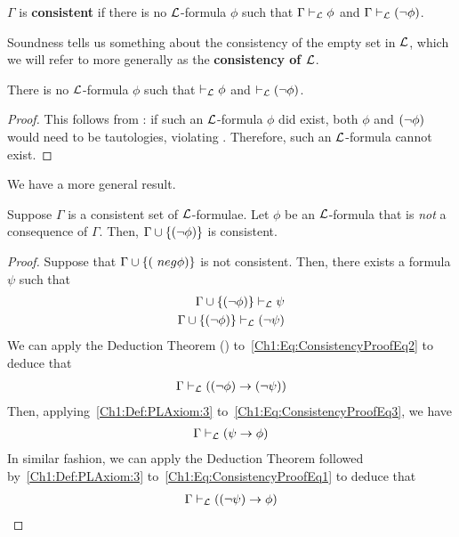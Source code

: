 \begin{boxdefinition}[Consistency]
    $\Gamma$ is \textbf{consistent} if there is no $\L$-formula $\phi$ such that $\Gamma \vdash_{\mathcal{L}} \phi$ and $\Gamma \vdash_{\mathcal{L}} \left( \neg \phi \right)$.
\end{boxdefinition}

Soundness tells us something about the consistency of the empty set in $\L$, which we will refer to more generally as the \textbf{consistency of $\L$}.

\begin{boxtheorem}[Consistency of $\L$]
    There is no $\L$-formula $\phi$ such that $\vdash_{\mathcal{L}} \phi$ and $\vdash_{\mathcal{L}} \left( \neg \phi \right)$.
\end{boxtheorem}
\begin{proof}
    This follows from : if such an $\L$-formula $\phi$ did exist, both $\phi$ and $\left( \neg \phi \right)$ would need to be tautologies, violating . Therefore, such an $\L$-formula cannot exist.
\end{proof}

We have a more general result.

\begin{boxproposition}
    Suppose $\Gamma$ is a consistent set of $\L$-formulae. Let $\phi$ be an $\L$-formula that is \emph{not} a consequence of $\Gamma$. Then, $\Gamma \cup \left\{ \left( \neg \phi \right) \right\}$ is consistent.
\end{boxproposition}
\begin{proof}
    Suppose that $\Gamma \cup \left\{ \left( \ neg \phi \right) \right\}$ is not consistent. Then, there exists a formula $\psi$ such that
    \begin{align}
        \Gamma \cup \left\{ \left( \neg \phi \right) \right\} \vdash_{\mathcal{L}} \psi
        \label{Ch1:Eq:ConsistencyProofEq1} \\
        \Gamma \cup \left\{ \left( \neg \phi \right) \right\} \vdash_{\mathcal{L}} \left( \neg \psi \right)
        \label{Ch1:Eq:ConsistencyProofEq2}
    \end{align}
    We can apply the Deduction Theorem () to~\eqref{Ch1:Eq:ConsistencyProofEq2} to deduce that
    \begin{align}
        \Gamma \vdash_{\mathcal{L}} \left( \left( \neg \phi \right) \to \left( \neg \psi \right) \right)
        \label{Ch1:Eq:ConsistencyProofEq3}
    \end{align}
    Then, applying~\ref{Ch1:Def:PLAxiom:3} to~\eqref{Ch1:Eq:ConsistencyProofEq3}, we have
    \begin{align}
        \Gamma \vdash_{\mathcal{L}} \left( \psi \to \phi \right)
        \label{Ch1:Eq:ConsistencyProofEq4}
    \end{align}
    In similar fashion, we can apply the Deduction Theorem followed by~\ref{Ch1:Def:PLAxiom:3} to~\eqref{Ch1:Eq:ConsistencyProofEq1} to deduce that
    \begin{align}
        \Gamma \vdash_{\mathcal{L}} \left( \left( \neg \psi \right) \to \phi \right)
        \label{Ch1:Eq:ConsistencyProofEq5}
    \end{align}
    \sorry %
\end{proof}

